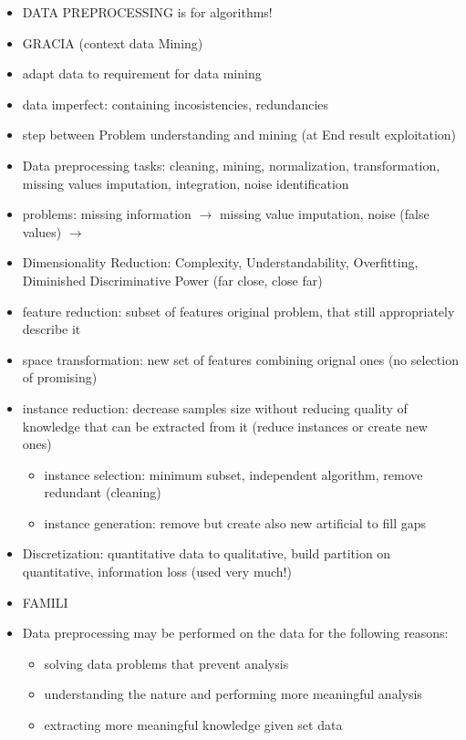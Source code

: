 \documentclass[preview]{standalone}
\begin{document}
\begin{itemize}
	\item DATA PREPROCESSING is for algorithms!
	\item GRACIA (context data Mining)
	\item adapt data to requirement for data mining
	\item data imperfect: containing incosistencies, redundancies
	\item step between Problem understanding and mining (at End result exploitation)
	\item Data preprocessing tasks: cleaning, mining, normalization, transformation, missing values imputation, integration, noise identification
	\item problems: missing information $\to$ missing value imputation, noise (false values) $\to$
	\item Dimensionality Reduction: Complexity, Understandability, Overfitting, Diminished Discriminative Power (far close, close far)
	\item feature reduction: subset of features original problem, that still appropriately describe it
	\item space transformation: new set of features combining orignal ones (no selection of promising)
	\item instance reduction: decrease samples size without reducing quality of knowledge that can be extracted from it (reduce instances or create new ones)
	\begin{itemize}
		\item instance selection: minimum subset, independent algorithm, remove redundant (cleaning)
		\item instance generation: remove but create also new artificial to fill gaps
	\end{itemize}
	\item Discretization: quantitative data to qualitative, build partition on quantitative, information loss (used very much!)
	\item FAMILI
	\item Data preprocessing may be performed on the data for the following reasons:
	\begin{itemize}
		\item solving data problems that prevent analysis
		\item understanding the nature and performing more meaningful analysis
		\item extracting more meaningful knowledge given set data
	\end{itemize}

\end{itemize}
\end{document}
